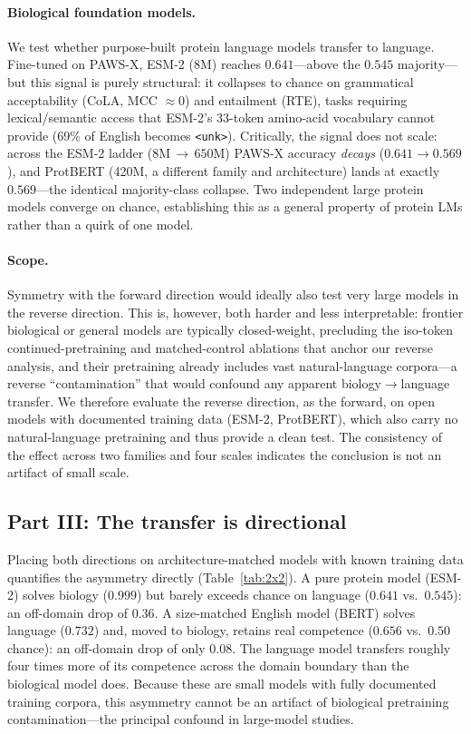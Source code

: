 \documentclass[11pt]{article}
\begin{document}
\paragraph{Biological foundation models.} We test whether purpose-built protein language models
\cite{rives2021esm,lin2023esm2} transfer to language. Fine-tuned on PAWS-X, ESM-2 (8M) reaches $0.641$---above the $0.545$
majority---but this signal is purely structural: it collapses to chance on grammatical
acceptability (CoLA, MCC $\approx 0$) and entailment (RTE), tasks requiring lexical/semantic
access that ESM-2's 33-token amino-acid vocabulary cannot provide (69\% of English becomes
\texttt{<unk>}). Critically, the signal does not scale: across the ESM-2 ladder
($8$M\,$\rightarrow$\,$650$M) PAWS-X accuracy \emph{decays} ($0.641\!\rightarrow\!0.569$), and
ProtBERT (420M, a different family and architecture) lands at exactly $0.569$---the identical
majority-class collapse. Two independent large protein models converge on chance, establishing
this as a general property of protein LMs rather than a quirk of one model.

\paragraph{Scope.} Symmetry with the forward direction would ideally also test very large models
in the reverse direction. This is, however, both harder and less interpretable: frontier
biological or general models are typically closed-weight, precluding the iso-token
continued-pretraining and matched-control ablations that anchor our reverse analysis, and their
pretraining already includes vast natural-language corpora---a reverse ``contamination'' that would
confound any apparent biology$\rightarrow$language transfer. We therefore evaluate the reverse
direction, as the forward, on open models with documented training data (ESM-2, ProtBERT), which
also carry no natural-language pretraining and thus provide a clean test. The consistency of the
effect across two families and four scales indicates the conclusion is not an artifact of small
scale.

\subsection{Part III: The transfer is directional}
Placing both directions on architecture-matched models with known training data quantifies the
asymmetry directly (Table~\ref{tab:2x2}). A pure protein model (ESM-2) solves biology
($0.999$) but barely exceeds chance on language ($0.641$ vs.\ $0.545$): an off-domain drop of
$0.36$. A size-matched English model (BERT) solves language ($0.732$) and, moved to biology,
retains real competence ($0.656$ vs.\ $0.50$ chance): an off-domain drop of only $0.08$. The
language model transfers roughly four times more of its competence across the domain boundary
than the biological model does. Because these are small models with fully documented training
corpora, this asymmetry cannot be an artifact of biological pretraining contamination---the
principal confound in large-model studies.
\end{document}
